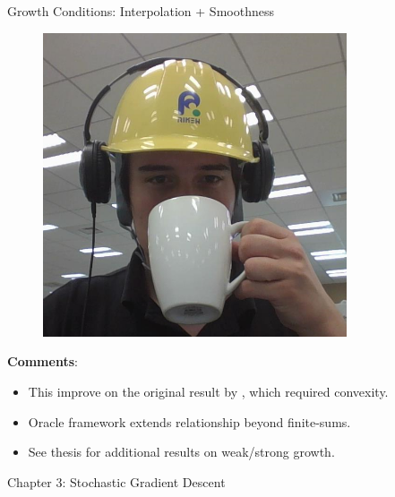 \documentclass[mathserif,notheorems, hyperref={colorlinks, citecolor=blue, urlcolor=blue, linkcolor=blue}]{beamer}
\def\\{}%
\begin{document}
\begin{frame}{Growth Conditions: Interpolation + Smoothness}
\begin{center}
\begin{minipage}[t]{0.15\textwidth}
\begin{figure}[t]
                \vspace{0.5ex}

                \includegraphics[width=0.8\textwidth]{collaborators/fred}
            \end{figure} 
        \end{minipage}
        
    \end{center}
    \textbf{Comments}:
    \begin{itemize}
        \item This improve on the original result by \citet{vaswani2019fast}, which required convexity.
        \item Oracle framework extends relationship beyond finite-sums. 
        \item See thesis for additional results on weak/strong growth. 
    \end{itemize}

    \end{frame}


    \begin{frame}
       \begin{center}
          \huge Chapter 3: Stochastic Gradient Descent\\
       \end{center} 
    \end{frame}
    
\end{document}
